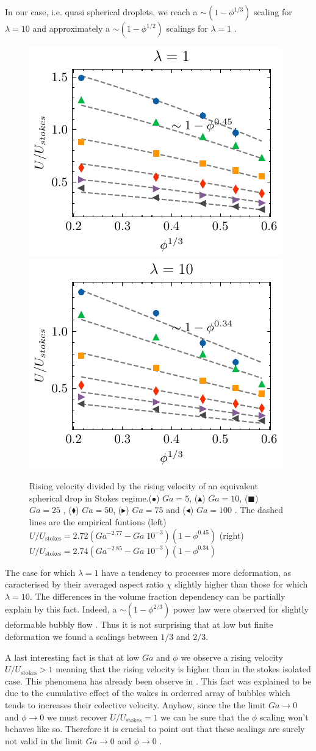 In our case, i.e. quasi spherical droplets, we reach a $\sim (1 - \phi^{1/3})$ scaling for $\lambda = 10$ and approximately a $\sim (1 - \phi^{1/2})$ scalings for $\lambda = 1$ .
\begin{figure}[h!]
    \centering
    \includegraphics[height = 0.35\textwidth]{image/HOMOGENEOUS/fCA/UstokesGa_mu_r_1-0.pdf}
    \includegraphics[height = 0.35\textwidth]{image/HOMOGENEOUS/fCA/UstokesGa_mu_r_0-1.pdf}
    \caption{Rising velocity divided by the rising velocity of an equivalent spherical drop in Stokes regime.($\bullet$) $Ga = 5$, ($\blacktriangle$) $Ga = 10$, ($\blacksquare$) $Ga = 25$ , ($\blacklozenge$) $Ga = 50$, ($\blacktriangleright$) $Ga = 75$ and ($\blacktriangleleft$) $Ga = 100$ . 
    The dashed lines are the empirical funtions (left)  
    $U/U_\text{stokes} = 2.72(Ga^{-2.77} - Ga\;10^{-3}) (1 - \phi^{0.45})$
    (right)  $U/U_\text{stokes} = 2.74(Ga^{-2.85} - Ga \;10^{-3}) (1 - \phi^{0.34})$ }
    \label{fig:U}
\end{figure}

The case for which $\lambda = 1$ have a tendency to processes more deformation, as caracterised by their averaged aspect ratio $\chi$ slightly higher than those for which $\lambda = 10$. 
The differences in the volume fraction dependency can be partially explain by this fact. 
Indeed, a  $\sim (1 - \phi^{2/3})$ power law were observed for slightly deformable bubbly flow \cite{zhang2021direct}. 
Thus it is not surprising that at low but finite deformation we found a scalings between $1/3$ and $2/3$. 

A last interesting fact is that at low $Ga$ and $\phi$ we observe a rising velocity $U / U_\text{stokes} > 1$ meaning that the rising velocity is higher than in the stokes isolated case. 
This phenomena has already been observe in \citet{loisy2017buoyancy}. 
This fact was explained to be due to the cumulative effect of the wakes in orderred array of bubbles  which tends to increases their colective velocity. 
Anyhow, since the the limit $Ga \rightarrow 0$ and $\phi \rightarrow 0$ we must recover $U/U_\text{stokes} = 1$ we can be sure that the $\phi$ scaling won't behaves like so.
Therefore it is crucial to point out that these scalings are surely not valid in the limit  $Ga \rightarrow 0$ and $\phi \rightarrow 0$ .

